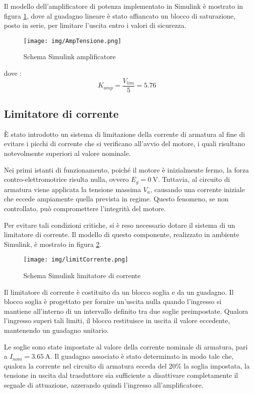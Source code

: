 \documentclass{article}
\begin{document}
Il modello dell’amplificatore di potenza implementato in Simulink è mostrato in figura \ref{fig:amp}, dove al guadagno lineare è stato affiancato un blocco di saturazione, posto in serie, per limitare l’uscita entro i valori di sicurezza.

\newpage
\begin{figure}[!h]
\centering
\texttt{[image: img/AmpTensione.png]}
\caption{Schema Simulink amplificatore}
\label{fig:amp}
\end{figure}

dove :
$$K_{amp} = \frac{V_{lim}}{5} = 5.76$$
\subsection{Limitatore di corrente}
È stato introdotto un sistema di limitazione della corrente di armatura al fine di evitare i picchi di corrente che si verificano all’avvio del motore, i quali risultano notevolmente superiori al valore nominale.

Nei primi istanti di funzionamento, poiché il motore è inizialmente fermo, la forza contro-elettromotrice risulta nulla, ovvero $E_g = 0~\text{V}$. Tuttavia, al circuito di armatura viene applicata la tensione massima $V_a$, causando una corrente iniziale che eccede ampiamente quella prevista in regime. Questo fenomeno, se non controllato, può compromettere l’integrità del motore.

Per evitare tali condizioni critiche, si è reso necessario dotare il sistema di un limitatore di corrente. Il modello di questo componente, realizzato in ambiente Simulink, è mostrato in figura \ref{fig:limi}.

\begin{figure}[!h]
\centering
\texttt{[image: img/limitCorrente.png]}
\caption{Schema Simulink limitatore di corrente}
\label{fig:limi}
\end{figure}

Il limitatore di corrente è costituito da un blocco soglia e da un guadagno. Il blocco soglia è progettato per fornire un’uscita nulla quando l’ingresso si mantiene all’interno di un intervallo definito tra due soglie preimpostate. Qualora l’ingresso superi tali limiti, il blocco restituisce in uscita il valore eccedente, mantenendo un guadagno unitario.

Le soglie sono state impostate al valore della corrente nominale di armatura, pari a $I_{nom} = 3.65~\text{A}$. Il guadagno associato è stato determinato in modo tale che, qualora la corrente nel circuito di armatura ecceda del 20\% la soglia impostata, la tensione in uscita dal trasduttore sia sufficiente a disattivare completamente il segnale di attuazione, azzerando quindi l’ingresso all’amplificatore. 
\end{document}
